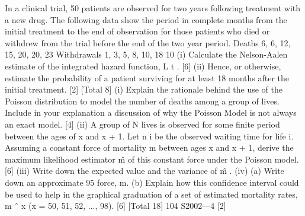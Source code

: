 \documentclass[a4paper,12pt]{article}
\begin{document}
\begin{enumerate}
In a clinical trial, 50 patients are observed for two years following treatment with a
new drug. The following data show the period in complete months from the initial
treatment to the end of observation for those patients who died or withdrew from the
trial before the end of the two year period.
Deaths
6, 6, 12, 15, 20, 20, 23
Withdrawals 1, 3, 5, 8, 10, 18
10
(i) Calculate the Nelson-Aalen estimate of the integrated hazard function, L t . [6]
(ii) Hence, or otherwise, estimate the probability of a patient surviving for at least
18 months after the initial treatment.
[2]
[Total 8]
(i) Explain the rationale behind the use of the Poisson distribution to model the
number of deaths among a group of lives. Include in your explanation a
discussion of why the Poisson Model is not always an exact model.
[4]
(ii) A group of N lives is observed for some finite period between the ages of x
and x + 1. Let n i be the observed waiting time for life i. Assuming a constant
force of mortality m between ages x and x + 1, derive the maximum likelihood
estimator m̂ of this constant force under the Poisson model.
[6]
(iii) Write down the expected value and the variance of m̂ .
(iv) (a)
Write down an approximate 95%
force, m.
(b)
Explain how this confidence interval could be used to help in the
graphical graduation of a set of estimated mortality rates, m ˆ x (x = 50,
51, 52, ..., 98).
[6]
[Total 18]
104 S2002—4
[2]


\end{enumerate}
\end{document}
